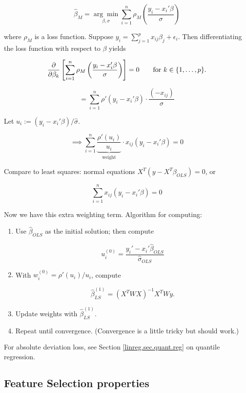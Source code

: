 \[
\hat{\beta}_M = \underset{\beta, \sigma}{\arg \min} \sum_{i=1}^n \rho_M \left(  \frac{y_i - x_i' \beta}{\sigma} \right)
\]

where \(\rho_M\) is a loss function. Suppose \(y_i = \sum_{j=1}^p x_{ij} \beta_j + \epsilon_i\). Then differentiating the loss function with respect to \(\beta\) yields

\[
\frac{\partial }{\partial \beta_k} \left[ \sum_{i=1}^n \rho_M \left(  \frac{y_i - x_i' \beta}{\sigma} \right) \right] = 0 \qquad \text{for } k \in \{1, \ldots, p\}.
\]

\[
= \sum_{i=1}^n \rho'(y_i - x_i' \beta) \cdot \frac{(- x_{ij}) }{\sigma} 
\]

Let \(u_i := (y_i - x_i' \beta)/\hat{\sigma}\). 

\[
\implies \sum_{i=1}^n \underbrace{ \frac{ \rho'(u_i)}{u_i} }_{\text{weight}} \cdot x_{ij} (y_i - x_i' \beta) = 0 
\]

Compare to least squares: normal equations \(X^T(y - X^T \beta_{OLS}) = 0\), or

\[
\sum_{i=1}^n x_{ij} (y_i - x_i' \beta) = 0 
\]

Now we have this extra weighting term. Algorithm for computing:

\begin{enumerate}

\item Use \(\hat{\beta}_{OLS}\) as the initial solution; then compute  

\[
u_i^{(0)} = \frac{ y_i' - x_i' \hat{\beta}_{OLS}}{\hat{\sigma}_{OLS}} 
\]

\item With \(w_i^{(0)} = \rho'(u_i)/u_i\), compute 

\[
\hat{\beta}_{LS}^{(1)} = (X^TW X)^{-1} X^T W y .
\]

\item Update weights with \(\hat{\beta}_{LS}^{(1)}\).

\item Repeat until convergence. (Convergence is a little tricky but should work.)

\end{enumerate}



For absolute deviation loss, see Section \ref{linreg.sec.quant.reg} on quantile regression.

\subsection{Feature Selection properties}

